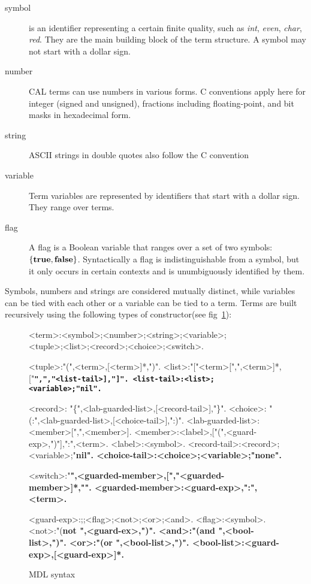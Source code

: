\documentclass[11pt]{report}
\newcommand\la{\bf\textlangle\xspace}  \newcommand\ra{\bf\textrangle\xspace}
\begin{document}
\begin{description}
\item[symbol] is an identifier representing a certain finite quality, such as {\em int}, {\em even}, {\em char}, {\em red}. They are the main building block of the term structure. A symbol may not start with a dollar sign.
\item[number] CAL terms can use numbers in various forms. C conventions apply here for integer (signed and unsigned), fractions including floating-point, and bit masks in hexadecimal form.
\item[string] ASCII strings in double quotes also follow the C convention
\item[variable] Term variables are represented by identifiers that start with a dollar sign. They range over terms.
\item[flag]	A flag is a Boolean variable that ranges over a set of two symbols: $\{\hbox{\bf true},\hbox{\bf false}\}$. Syntactically a flag is indistinguishable from a symbol, but it only occurs in certain contexts and is unumbiguously identified by them.
\end{description}

Symbols, numbers and strings are considered mutually distinct, while variables can be tied with each other or a variable can be tied to a term. Terms are built recursively using the following types of constructor(see fig~\ref{fig:mdl}):
\def\dbbr{\tt\bf\textbar\kern-1pt\textbar}
\begin{figure}[htb]
\begin{framed}
\small
\begin{grammar}

<term>:<symbol>;<number>;<string>;<variable>;\\
<tuple>;<list>;<record>;<choice>;<switch>.

<tuple>:"(",<term>,[<term>]*,")".
<list>:"["<term>[",",<term>]*,["\dbbr",","<list-tail>],"]".
<list-tail>:<list>;<variable>;"\bf nil".

<record>: "\{",<lab-guarded-list>,[<record-tail>],"\}".
<choice>:  "(:",<lab-guarded-list>,[<choice-tail>],":)".
<lab-guarded-list>:<member>[",",<member>].
<member>:<label>,["(",<guard-exp>,")"],":",<term>.
<label>:<symbol>.
<record-tail>:<record>;<variable>;"\bf nil".
<choice-tail>:<choice>;<variable>;"\bf none".

<switch>:"\la",<guarded-member>,[","<guarded-member>]*,"\ra".
<guarded-member>:<guard-exp>,":",<term>.

<guard-exp>:\true;\false;<flag>;<not>;<or>;<and>.
<flag>:<symbol>.
<not>:"(\bf not ",<guard-ex>,")".
<and>:"(\bf and ",<bool-list>,")".
<or>:"(\bf or ",<bool-list>,")".
<bool-list>:<guard-exp>,[<guard-exp>]*.
\end{grammar}
\end{framed}
\caption{MDL syntax\label{fig:mdl}}
\end{figure}
\end{document}
